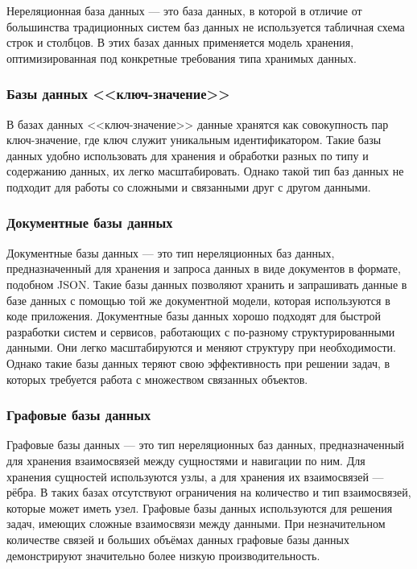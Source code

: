 Нереляционная база данных --- это база данных, в которой в отличие от большинства традиционных систем баз данных не используется табличная схема строк и столбцов. В этих базах данных применяется модель хранения, оптимизированная под конкретные требования типа хранимых данных.

\subsubsection{Базы данных <<ключ-значение>>}

В базах данных <<ключ-значение>> данные хранятся как совокупность пар ключ-значение, где ключ служит уникальным идентификатором. Такие базы данных удобно использовать для хранения и обработки разных по типу и содержанию данных, их легко масштабировать. Однако такой тип баз данных не подходит для работы со сложными и связанными друг с другом данными.

\subsubsection{Документные базы данных}

Документные базы данных --- это тип нереляционных баз данных, предназначенный для хранения и запроса данных в виде документов в формате, подобном JSON. Такие базы данных позволяют хранить и запрашивать данные в базе данных с помощью той же документной модели, которая используются в коде приложения. Документные базы данных хорошо подходят для быстрой разработки систем и сервисов, работающих с по-разному структурированными данными. Они легко масштабируются и меняют структуру при необходимости. Однако такие базы данных теряют свою эффективность при решении задач, в которых требуется работа с множеством связанных объектов.

\subsubsection{Графовые базы данных}

Графовые базы данных --- это тип нереляционных баз данных, предназначенный для хранения взаимосвязей между сущностями и навигации по ним. Для хранения сущностей используются узлы, а для хранения их взаимосвязей --- рёбра. В таких базах отсутствуют ограничения на количество и тип взаимосвязей, которые может иметь узел. Графовые базы данных используются для решения задач, имеющих сложные взаимосвязи между данными. При незначительном количестве связей и больших объёмах данных графовые базы данных демонстрируют значительно более низкую производительность.

